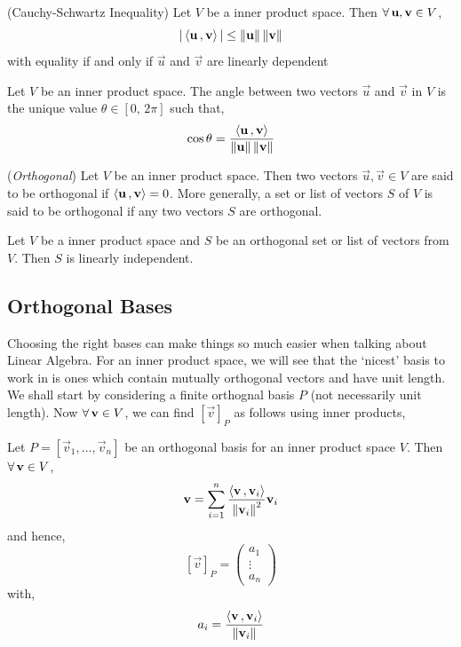 \documentclass{article}
\begin{document}
\begin{nthm}{(Cauchy-Schwartz Inequality)}
  Let $V$ be a inner product space. Then $\forall\, \boldsymbol{\mathbf{u}}, \boldsymbol{\mathbf{v}}\in V$,
  $$ |\left\langle \boldsymbol{\mathbf{u}}\,, \boldsymbol{\mathbf{v}} \right\rangle| \le \left\lVert \boldsymbol{\mathbf{u}}\right\rVert\left\lVert \boldsymbol{\mathbf{v}}\right\rVert $$
  with equality if and only if $\vec u$ and $\vec v$ are linearly dependent
\end{nthm}

\begin{ndefi}
  Let $V$ be an inner product space. The angle between two vectors $\vec u$ and $\vec v$ in $V$ is the unique value $\theta \in [0,\, 2\pi]$ such that,
  $$ \cos\theta = \frac{\left\langle \boldsymbol{\mathbf{u}}\,, \boldsymbol{\mathbf{v}} \right\rangle}{\left\lVert \boldsymbol{\mathbf{u}}\right\rVert\left\lVert \boldsymbol{\mathbf{v}}\right\rVert} $$
\end{ndefi}

\begin{ndefi}{(\textit{Orthogonal})}
  Let $V$ be an inner product space. Then two vectors $\vec u, \vec v\in V$ are said to be orthogonal if $\left\langle \boldsymbol{\mathbf{u}}\,, \boldsymbol{\mathbf{v}} \right\rangle = 0$. More generally, a set or list of vectors $S$ of $V$ is said to be orthogonal if any two vectors $S$ are orthogonal.
\end{ndefi}

\begin{nlemma}{}
  Let $V$ be a inner product space and $S$ be an orthogonal set or list of vectors from $V$. Then $S$ is linearly independent.
\end{nlemma}

\subsection{Orthogonal Bases}

Choosing the right bases can make things so much easier when talking about Linear Algebra. For an inner product space, we will see that the `nicest' basis to work in is ones which contain mutually orthogonal vectors and have unit length. We shall start by considering a finite orthognal basis $P$ (not necessarily unit length). Now $\forall\, \boldsymbol{\mathbf{v}} \in V$, we can find $[\vec v]_P$ as follows using inner products,

\begin{nthm}
  Let $P = [\vec v_1, \dots, \vec v_n]$ be an orthogonal basis for an inner product space $V$. Then $\forall\, \boldsymbol{\mathbf{v}} \in V$,
  $$ \boldsymbol{\mathbf{v}} = \sum_{i = 1}^n {\frac{\left\langle \boldsymbol{\mathbf{v}}\,, \boldsymbol{\mathbf{v}}_i \right\rangle}{\left\lVert \boldsymbol{\mathbf{v}}_i\right\rVert^2}\boldsymbol{\mathbf{v}}_i} $$
  and hence,
  $$ [\vec v]_P = \begin{pmatrix}
    a_1 \\ \vdots\\ a_n
  \end{pmatrix} $$
  with,
  $$ a_i = \frac{\left\langle \boldsymbol{\mathbf{v}}\,, \boldsymbol{\mathbf{v}}_i \right\rangle}{\left\lVert \boldsymbol{\mathbf{v}}_i\right\rVert} $$
\end{nthm}
\end{document}
